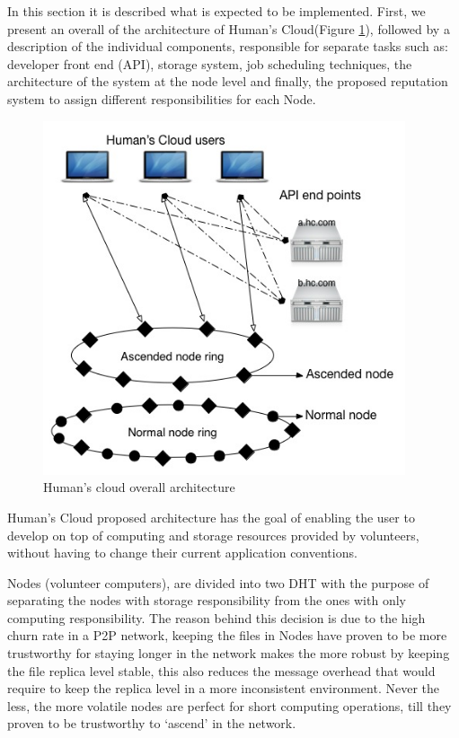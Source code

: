 \documentclass{./llncs2e/llncs}
\begin{document}
In this section it is described what is expected to be implemented. First, we present an overall of the architecture of Human's Cloud(Figure \ref{fig:overallarchitecture}), followed by a description of the individual components, responsible for separate tasks such as: developer front end (API), storage system, job scheduling techniques, the architecture of the system at the node level and finally, the proposed reputation system to assign different responsibilities for each Node.

\begin{figure}[h!]
  \centering
  \includegraphics[width=0.95\textwidth]{img/overall.jpg}
  \caption{Human's cloud overall architecture}
  \label{fig:overallarchitecture}
\end{figure}

Human's Cloud proposed architecture has the goal of enabling the user to develop on top of computing and storage resources provided by volunteers, without having to change their current application conventions. 

Nodes (volunteer computers), are divided into two DHT with the purpose of separating the nodes with storage responsibility from the ones with only computing responsibility. The reason behind this decision is due to the high churn rate in a P2P network, keeping the files in Nodes have proven to be more trustworthy for staying longer in the network makes the more robust by keeping the file replica level stable, this also reduces the message overhead that would require to keep the replica level in a more inconsistent environment. Never the less, the more volatile nodes are perfect for short computing operations, till they proven to be trustworthy to `ascend' in the network.
\end{document}

